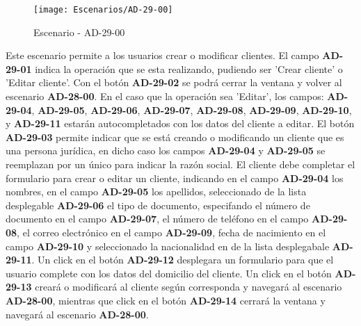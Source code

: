 \begin{figure}[H]
\centering
\texttt{[image: Escenarios/AD-29-00]}
\caption{Escenario - AD-29-00}
\label{fig:AD-29-00}
\end{figure}
Este escenario permite a los usuarios crear o modificar clientes. El campo \textbf{AD-29-01} indica la operación que se esta realizando, pudiendo ser 'Crear cliente' o 'Editar cliente'.
Con el botón \textbf{AD-29-02} se podrá cerrar la ventana y volver al escenario \textbf{AD-28-00}.
En el caso que la operación sea 'Editar', los campos: \textbf{AD-29-04}, \textbf{AD-29-05}, \textbf{AD-29-06}, \textbf{AD-29-07}, \textbf{AD-29-08}, \textbf{AD-29-09}, \textbf{AD-29-10}, y \textbf{AD-29-11} estarán autocompletados con los datos del cliente a editar.
El botón \textbf{AD-29-03} permite indicar que se está creando o modificando un cliente que es una persona jurídica, en dicho caso los campos \textbf{AD-29-04} y \textbf{AD-29-05} se reemplazan por un único para indicar la razón social. El cliente debe completar el formulario para crear o editar un cliente, indicando en el campo \textbf{AD-29-04} los nombres, en el campo \textbf{AD-29-05} los apellidos, seleccionado de la lista desplegable \textbf{AD-29-06} el tipo de documento, especifando el número de documento en el campo \textbf{AD-29-07}, el número de teléfono en el campo \textbf{AD-29-08}, el correo electrónico en el campo \textbf{AD-29-09}, fecha de nacimiento en el campo \textbf{AD-29-10} y seleccionado la nacionalidad en de la lista desplegabale \textbf{AD-29-11}. 
Un click en el botón \textbf{AD-29-12} desplegara un formulario para que el usuario complete con los datos del domicilio del cliente.
Un click en el botón \textbf{AD-29-13} creará o modificará al cliente según corresponda y navegará al escenario \textbf{AD-28-00}, mientras que click en el botón \textbf{AD-29-14} cerrará la ventana y navegará al escenario \textbf{AD-28-00}.
\clearpage
